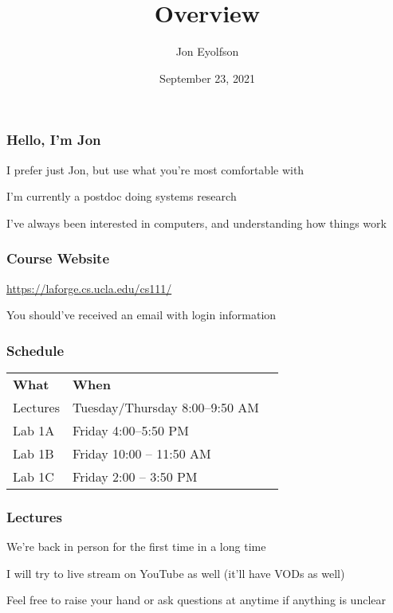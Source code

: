 

\title{Overview}
\author{Jon Eyolfson}
\date{September 23, 2021}



  \begin{frame}
    \titlepage
  \end{frame}

  \begin{frame}
    \frametitle{Hello, I'm Jon}

    I prefer just Jon, but use what you're most comfortable with

    \vspace{2em}

    I'm currently a postdoc doing systems research

    \vspace{2em}

    I've always been interested in computers, and understanding how things work
  \end{frame}

  \begin{frame}
    \frametitle{Course Website}

    \url{https://laforge.cs.ucla.edu/cs111/}

    \vspace{2em}

    You should've received an email with login information
  \end{frame}

  \begin{frame}
    \frametitle{Schedule}

    \begin{tabular}{lll}
      \textbf{What} & \textbf{When} \\
      Lectures      & Tuesday/Thursday 8:00--9:50 AM \\
      Lab 1A        & Friday 4:00--5:50 PM \\
      Lab 1B        & Friday 10:00 -- 11:50 AM  \\
      Lab 1C        & Friday 2:00 -- 3:50 PM  \\
    \end{tabular}
  \end{frame}

  \begin{frame}
    \frametitle{Lectures}

    We're back in person for the first time in a long time

    \vspace{2em}

    I will try to live stream on YouTube as well (it'll have VODs as well)

    \vspace{2em}

    Feel free to raise your hand or ask questions at anytime if anything is
    unclear
  \end{frame}

